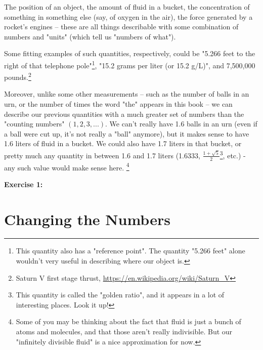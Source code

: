 \documentclass{book}
\begin{document}
The position of an object, the amount of fluid in a bucket, the concentration of something in something else (say, of oxygen in the air), the force generated by a rocket's engines -- these are all things describable with some combination of numbers and "units" (which tell us "numbers of what"). 


Some fitting examples of such quantities, respectively, could be "5.266 feet to the right of that telephone pole"\footnote{This quantity also has a "reference point". The quantity "5.266 feet" alone wouldn't very useful in describing where our object is.}, "15.2 grams per liter (or 15.2 g/L)", and 7,500,000 pounds.\footnote{Saturn V first stage thrust, \url{https://en.wikipedia.org/wiki/Saturn_V}}



Moreover, unlike some other measurements -- such as the number of balls in an urn, or the number of times the word "the" appears in this book -- we can describe our previous quantities with a much greater set of numbers than the "counting numbers" $(1, 2, 3, ...)$. We can't really have 1.6 balls in an urn (even if a ball were cut up, it's not really a "ball" anymore), but it makes sense to have 1.6 liters of fluid in a bucket. We could also have 1.7 liters in that bucket, or pretty much any quantity in between 1.6 and 1.7 liters (1.6333, $\frac{1 + \sqrt{5}}{2}$\footnote{This quantity is called the "golden ratio", and it appears in a lot of interesting places. Look it up!}, etc.) - any such value would make sense here. \footnote{Some of you may be thinking about the fact that fluid is just a bunch of atoms and molecules, and that those aren't really indivisible. But our "infinitely divisible fluid" is a nice approximation for now.}


\textbf{Exercise 1:} 



\section{Changing the Numbers}

\end{document}
